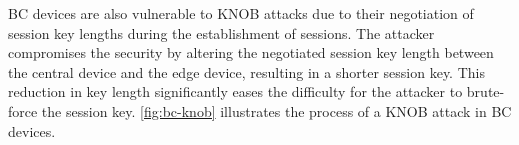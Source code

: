 \documentclass[../main.tex]{subfiles}  %
\begin{document}
BC devices are  also vulnerable to KNOB attacks due to their negotiation of session key lengths during the establishment of sessions.
The attacker compromises the security by altering the negotiated session key length between the central device and the edge device, resulting in a shorter session key. This reduction in key length significantly eases the difficulty for the attacker to brute-force the session key.
\autoref{fig:bc-knob} illustrates the process of a KNOB attack in BC devices.

\end{document}
